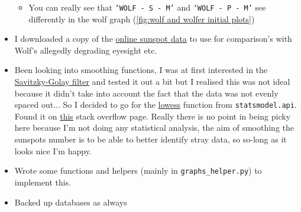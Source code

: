 \documentclass[12pt]{article}
\begin{document}
\begin{itemize}
\begin{itemize}
        \item You can really see that \texttt{`WOLF - S - M'} and \texttt{`WOLF - P - M'} see differently in the wolf graph (\ref{fig:wolf and wolfer initial plots})
    \end{itemize}
    \item I downloaded a copy of the \href{http://www.sidc.be/silso/datafiles}{online sunspot data} to use for comparison's with Wolf's allegedly degrading eyesight etc.
    \item Been looking into smoothing functions, I was at first interested in the \href{https://en.wikipedia.org/wiki/Savitzky-Golay_filter}{Savitzky-Golay filter} and tested it out a bit but I realised this was not ideal because it didn't take into account the fact that the data was not evenly spaced out... So I decided to go for the \href{https://www.statsmodels.org/dev/generated/statsmodels.nonparametric.smoothers_lowess.lowess.html}{lowess} function from \texttt{statsmodel.api}. Found it on \href{https://stackoverflow.com/questions/28536191/how-to-filter-smooth-with-scipy-numpy#28541805}{this} stack overflow page. Really there is no point in being picky here because I'm not doing any statistical analysis, the aim of smoothing the sunspots number is to be able to better identify stray data, so so-long as it looks nice I'm happy.
    \item Wrote some functions and helpers (mainly in \texttt{graphs\_helper.py}) to implement this.
    \item Backed up databases as always
\end{itemize}
\end{document}
